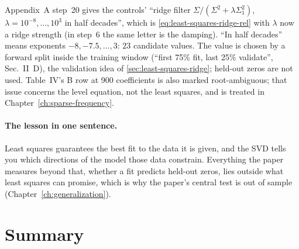 Appendix~A step~20 gives the controls' ``ridge filter $\Sigma/(\Sigma^2+\lambda\Sigma_1^2)$, $\lambda = 10^{-8},\dots,10^3$ in half decades'', which is \cref{eq:least-squares-ridge-rel} with $\lambda$ now a ridge strength (in step~6 the same letter is the damping). ``In half decades'' means exponents $-8, -7.5,\dots,3$: $23$ candidate values. The value is chosen by a forward split inside the training window (``first 75\% fit, last 25\% validate'', Sec.~II~D), the validation idea of \cref{sec:least-squares-ridge}; held-out zeros are not used. Table~IV's B row at 900 coefficients is also marked root-ambiguous; that issue concerns the level equation, not the least squares, and is treated in Chapter~\ref{ch:sparse-frequency}.

\paragraph{The lesson in one sentence.} Least squares guarantees the best fit to the data it is given, and the SVD tells you which directions of the model those data constrain. Everything the paper measures beyond that, whether a fit predicts held-out zeros, lies outside what least squares can promise, which is why the paper's central test is out of sample (Chapter~\ref{ch:generalization}).

\section{Summary}\label{sec:least-squares-summary}

